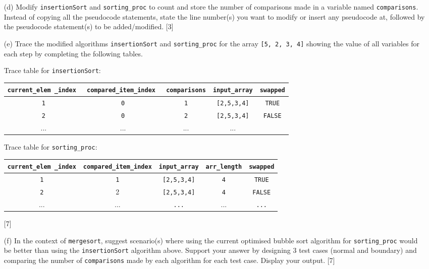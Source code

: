 \begin{enumerate}
\item[(d)]  Modify \texttt{insertionSort} and \texttt{sorting\_proc} to count
and store the number of comparisons made in a variable named \texttt{comparisons}.
Instead of copying all the pseudocode statements, state the line number(s)
you want to modify or insert any pseudocode at, followed by the pseudocode
statement(s) to be added/modified. \hfill{}{[}3{]}
\item[(e)]  Trace the modified algorithms \texttt{insertionSort} and \texttt{sorting\_proc}
for the array \texttt{{[}5, 2, 3, 4{]}} showing the value of all variables
for each step by completing the following tables. 

Trace table for \texttt{insertionSort}: 

\texttt{}%
\begin{tabular}{|c|c|c|c|c|}
\hline 
\texttt{current\_elem \_index } & \texttt{compared\_item\_index } & \texttt{comparisons} & \texttt{input\_array} & \texttt{swapped}\tabularnewline
\hline 
\texttt{1} & \texttt{0} & \texttt{1} & \texttt{{[}2,5,3,4{]}} & \texttt{TRUE}\tabularnewline
\hline 
\texttt{2} & \texttt{0} & \texttt{2} & \texttt{{[}2,5,3,4{]}} & \texttt{FALSE}\tabularnewline
\hline 
... & ... & ... & ... & \tabularnewline
\hline 
\end{tabular}

Trace table for \texttt{sorting\_proc}: 

\texttt{}%
\begin{tabular}{|c|c|c|c|c|}
\hline 
\texttt{current\_elem \_index} & \texttt{compared\_item\_index} & \texttt{input\_array} & \texttt{arr\_length} & \texttt{swapped}\tabularnewline
\hline 
\texttt{1} & \texttt{1} & \texttt{{[}2,5,3,4{]}} & \texttt{4} & \texttt{TRUE}\tabularnewline
\hline 
\texttt{2} & 2 & \texttt{{[}2,5,3,4{]}} & \texttt{4} & \texttt{FALSE}\tabularnewline
\hline 
... & ... & \texttt{...} & ... & \texttt{...}\tabularnewline
\hline 
\end{tabular} 

\hfill{}{[}7{]}
\item[(f)]  In the context of \texttt{mergesort}, suggest scenario(s) where
using the current optimised bubble sort algorithm for \texttt{sorting\_proc}
would be better than using the \texttt{insertionSort} algorithm above.
Support your answer by designing 3 test cases (normal and boundary)
and comparing the number of \texttt{comparisons} made by each algorithm
for each test case. Display your output. \hfill{} {[}7{]}
\end{enumerate}